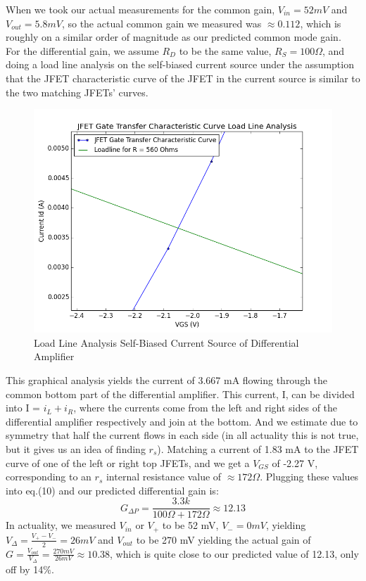 \documentclass{article}
\begin{document}
    When we took our actual measurements for the common gain, $V_{in} = 52 mV$ and $V_{out} = 5.8 mV$, so the actual common gain we measured was $\approx 0.112$, which is roughly on a similar order of magnitude as our predicted common mode gain.
    \\\indent For the differential gain, we assume $R_D$ to be the same value, $R_S = 100 \Omega$, and doing a load line analysis on the self-biased current source under the assumption that the JFET characteristic curve of the JFET in the current source is similar to the two matching JFETs' curves.
    \begin{figure}
        \centering
        \includegraphics[scale = 0.5]{5_15b.png}
        \caption{Load Line Analysis Self-Biased Current Source of Differential Amplifier}
        \label{fig:my_label}
    \end{figure}
    This graphical analysis yields the current of 3.667 mA flowing through the common bottom part of the differential amplifier. This current, I, can be divided into I = $i_L + i_R$, where the currents come from the left and right sides of the differential amplifier respectively and join at the bottom. And we estimate due to symmetry that half the current flows in each side (in all actuality this is not true, but it gives us an idea of finding $r_s$). Matching a current of 1.83 mA to the JFET curve of one of the left or right top JFETs, and we get a $V_{GS}$ of -2.27 V, corresponding to an $r_s$ internal resistance value of $\approx 172 \Omega$. Plugging these values into eq.(10) and our predicted differential gain is:
    \begin{equation}
        G_{\Delta P} = \frac{3.3k}{100 \Omega + 172 \Omega} \approx 12.13
    \end{equation}
    In actuality, we measured $V_{in}$ or $V_{+}$ to be 52 mV, $V_{-} = 0 mV$, yielding $V_{\Delta} = \frac{V_+ - V_-}{2} = 26 mV$ and $V_{out}$ to be 270 mV yielding the actual gain of $G = \frac{V_{out}}{V_{\Delta}} = \frac{270 mV}{26 mV} \approx 10.38$, which is quite close to our predicted value of 12.13, only off by 14$\%$.
    
\end{document}
